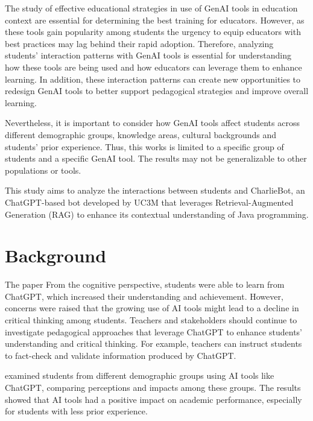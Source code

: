 \documentclass[conference]{IEEEtran}
\begin{document}

The study of effective educational strategies in use of GenAI tools in education
context are essential for determining the best training for educators. However,
as these tools gain popularity among students \cite{Dickey24} the urgency to
equip educators with best practices may lag behind their rapid adoption.
Therefore, analyzing students' interaction patterns with GenAI tools is
essential for understanding how these tools are being used and how educators can
leverage them to enhance learning. In addition, these interaction patterns can
create new opportunities to redesign GenAI tools to better support pedagogical
strategies and improve overall learning.


Nevertheless, it is important to consider how GenAI tools affect students across
different demographic groups, knowledge areas, cultural backgrounds \cite{catalan21}
\cite{neo22} and students' prior experience. Thus, this works is limited to a
specific group of students and a specific GenAI tool. The results may not be
generalizable to other populations or tools.


This study aims to analyze the interactions between students and CharlieBot,
an ChatGPT-based bot developed by UC3M that leverages Retrieval-Augmented
Generation (RAG) to enhance its contextual understanding of Java programming.

\section{Background}

The paper \cite{Lo24} From the cognitive perspective, students were able to
learn from ChatGPT, which increased their understanding and achievement.
However, concerns were raised that the growing use of AI tools might lead to
a decline in critical thinking among students. Teachers and stakeholders should
continue to investigate pedagogical approaches that leverage ChatGPT to enhance
students' understanding and critical thinking. For example, teachers can
instruct students to fact-check and validate information produced by ChatGPT.

examined students from different demographic groups
using AI tools like ChatGPT, comparing perceptions and impacts
among these groups. The results showed that AI tools had a positive impact on
academic performance, especially for students with less prior experience.
\end{document}
